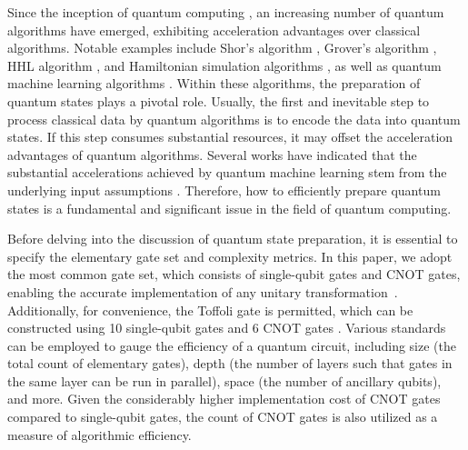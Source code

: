 \documentclass[a4paper,UKenglish,cleveref, autoref, thm-restate]{lipics-v2021}
\begin{document}
Since the inception of quantum computing \cite{feynman2018simulating}, an increasing number of quantum algorithms have emerged, exhibiting acceleration advantages over classical algorithms. Notable examples include  Shor's algorithm \cite{shor1994algorithms}, Grover's algorithm \cite{grover1996fast}, HHL algorithm \cite{harrow2009quantum}, and Hamiltonian simulation algorithms \cite{childs2018toward, low2017optimal, low2019hamiltonian, berry2015simulating}, as well as quantum machine learning algorithms \cite{lloyd2014quantum, kerenidis2016quantum, kerenidis2019q, kerenidis2021quantum, rebentrost2014quantum}. Within these algorithms, the preparation of quantum states plays a pivotal role. Usually, the first and inevitable step to process classical data by quantum algorithms is to encode the data into quantum states. If this step consumes substantial resources, it may offset the acceleration advantages of quantum algorithms. Several works have indicated that the substantial accelerations achieved by quantum machine learning stem from the underlying input assumptions \cite{tang2019quantum, chia2019quantum, tang2021quantum, chia2022sampling, gilyen2022improved}. Therefore, how to efficiently prepare quantum states is a fundamental and significant issue in the field of quantum computing.

Before delving into the discussion of quantum state preparation, it is essential to specify the elementary gate set and complexity metrics. In this paper, we adopt the most common gate set, which consists of single-qubit gates and CNOT gates, enabling the accurate implementation of any unitary transformation~\cite{barenco1995elementary}. Additionally, for convenience, the Toffoli gate is permitted, which can be constructed using 10 single-qubit gates and 6 CNOT gates \cite{nielsen2001quantum}. Various standards can be employed to gauge the efficiency of a quantum circuit, including size (the total count of elementary gates), depth (the number of layers such that gates in the same layer can be run in parallel), space (the number of ancillary qubits), and more. Given the considerably higher implementation cost of CNOT gates compared to single-qubit gates, the count of CNOT gates is also utilized as a measure of algorithmic efficiency.
\end{document}
